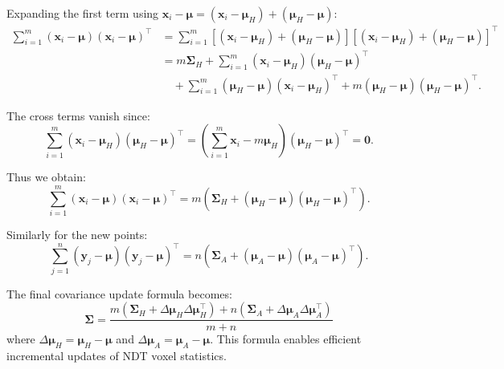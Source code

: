 Expanding the first term using $\mathbf{x}_i - \boldsymbol{\mu} = (\mathbf{x}_i - \boldsymbol{\mu}_H) + (\boldsymbol{\mu}_H - \boldsymbol{\mu})$:
\begin{align}\label{key}
	\sum_{i=1}^{m} (\mathbf{x}_i - \boldsymbol{\mu})(\mathbf{x}_i - \boldsymbol{\mu})^\top &= \sum_{i=1}^{m} \left[ (\mathbf{x}_i - \boldsymbol{\mu}_H) + (\boldsymbol{\mu}_H - \boldsymbol{\mu}) \right] \left[ (\mathbf{x}_i - \boldsymbol{\mu}_H) + (\boldsymbol{\mu}_H - \boldsymbol{\mu}) \right]^\top \\
	&= m\boldsymbol{\Sigma}_H + \sum_{i=1}^m (\mathbf{x}_i - \boldsymbol{\mu}_H)(\boldsymbol{\mu}_H - \boldsymbol{\mu})^\top \\
	&\quad + \sum_{i=1}^m (\boldsymbol{\mu}_H - \boldsymbol{\mu})(\mathbf{x}_i - \boldsymbol{\mu}_H)^\top + m(\boldsymbol{\mu}_H - \boldsymbol{\mu})(\boldsymbol{\mu}_H - \boldsymbol{\mu})^\top.
\end{align}

The cross terms vanish since:
\begin{equation}\label{key}
	\sum_{i=1}^m (\mathbf{x}_i - \boldsymbol{\mu}_H) (\boldsymbol{\mu}_H - \boldsymbol{\mu})^\top = \left(\sum_{i=1}^m \mathbf{x}_i - m\boldsymbol{\mu}_H\right)(\boldsymbol{\mu}_H - \boldsymbol{\mu})^\top = \mathbf{0}.
\end{equation}

Thus we obtain:
\begin{equation}\label{key}
	\sum_{i=1}^{m} (\mathbf{x}_i - \boldsymbol{\mu})(\mathbf{x}_i - \boldsymbol{\mu})^\top = m \left(\boldsymbol{\Sigma}_H + (\boldsymbol{\mu}_H - \boldsymbol{\mu})(\boldsymbol{\mu}_H - \boldsymbol{\mu})^\top\right).
\end{equation}

Similarly for the new points:
\begin{equation}\label{key}
	\sum_{j=1}^{n} (\mathbf{y}_j - \boldsymbol{\mu})(\mathbf{y}_j - \boldsymbol{\mu})^\top = n \left(\boldsymbol{\Sigma}_A + (\boldsymbol{\mu}_A - \boldsymbol{\mu})(\boldsymbol{\mu}_A - \boldsymbol{\mu})^\top\right).
\end{equation}

The final covariance update formula becomes:
\begin{equation}\label{key}
	\boldsymbol{\Sigma} = \frac{m \left(\boldsymbol{\Sigma}_H + \Delta\boldsymbol{\mu}_H \Delta\boldsymbol{\mu}_H^\top\right) + n \left(\boldsymbol{\Sigma}_A + \Delta\boldsymbol{\mu}_A \Delta\boldsymbol{\mu}_A^\top\right)}{m+n}
\end{equation}
where $\Delta\boldsymbol{\mu}_H = \boldsymbol{\mu}_H - \boldsymbol{\mu}$ and $\Delta\boldsymbol{\mu}_A = \boldsymbol{\mu}_A - \boldsymbol{\mu}$. This formula enables efficient incremental updates of NDT voxel statistics.

